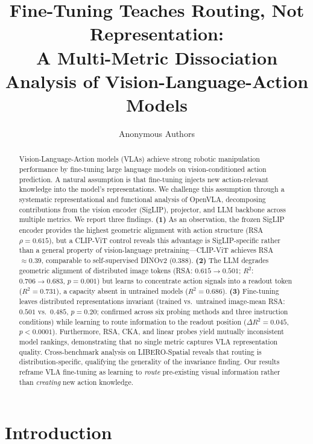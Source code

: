 \documentclass[letterpaper]{article}
\title{Fine-Tuning Teaches Routing, Not Representation:\\A Multi-Metric Dissociation Analysis of Vision-Language-Action Models}
\author{
Anonymous Authors
}
\date{}
\begin{document}
\maketitle

\begin{abstract}
Vision-Language-Action models (VLAs) achieve strong robotic manipulation performance by fine-tuning large language models on vision-conditioned action prediction. A natural assumption is that fine-tuning injects new action-relevant knowledge into the model's representations. We challenge this assumption through a systematic representational and functional analysis of OpenVLA, decomposing contributions from the vision encoder (SigLIP), projector, and LLM backbone across multiple metrics. We report three findings. \textbf{(1)} As an observation, the frozen SigLIP encoder provides the highest geometric alignment with action structure (RSA $\rho=0.615$), but a CLIP-ViT control reveals this advantage is SigLIP-specific rather than a general property of vision-language pretraining---CLIP-ViT achieves RSA~$\approx 0.39$, comparable to self-supervised DINOv2 ($0.388$). \textbf{(2)} The LLM degrades geometric alignment of distributed image tokens (RSA: $0.615 \to 0.501$; $R^2$: $0.706 \to 0.683$, $p{=}0.001$) but learns to concentrate action signals into a readout token ($R^2{=}0.731$), a capacity absent in untrained models ($R^2{=}0.686$). \textbf{(3)} Fine-tuning leaves distributed representations invariant (trained vs.\ untrained image-mean RSA: $0.501$ vs.\ $0.485$, $p{=}0.20$; confirmed across six probing methods and three instruction conditions) while learning to route information to the readout position ($\Delta R^2{=}0.045$, $p{<}0.0001$). Furthermore, RSA, CKA, and linear probes yield mutually inconsistent model rankings, demonstrating that no single metric captures VLA representation quality. Cross-benchmark analysis on LIBERO-Spatial reveals that routing is distribution-specific, qualifying the generality of the invariance finding. Our results reframe VLA fine-tuning as learning to \emph{route} pre-existing visual information rather than \emph{creating} new action knowledge.
\end{abstract}

\section{Introduction}
\label{sec:intro}
\end{document}
